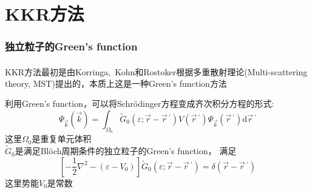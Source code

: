 \documentclass[cjk,slidestop,compress,mathserif,blue]{beamer}
\newcommand{\upcite}[1]{\hspace{0ex}\textsuperscript{\cite{#1}}} %
\begin{document}
\section{KKR方法}
\frame
{
	\frametitle{独立粒子的\textrm{Green's function}}
\textrm{KKR}方法最初是由\textrm{Korringa}\upcite{PA13-392_1947},~\textrm{Kohn}和\textrm{Rostoker}\upcite{PR94-1111_1954}根据多重散射理论\textrm{(Multi-scattering theory, MST)}提出的，本质上这是一种\textrm{Green's function}方法

利用\textrm{Green's function}，可以将\textrm{Schr\"odinger}方程变成齐次积分方程的形式:
\begin{displaymath}
	\Psi_{\vec k}(\vec k)=\int_{\Omega_0}\tilde G_0(\varepsilon;\vec r-\vec r\,^{\prime})V(\vec r\,^{\prime})\Psi_{\vec k}(\vec r\,^{\prime})\mathrm{d}\vec r\,^{\prime}
\end{displaymath}
这里$\Omega_0$是重复单元体积\\$\tilde G_0$是满足\textrm{Bl\"och}周期条件的独立粒子的\textrm{Green's function}，%
满足%
\begin{displaymath}
	\left[-\dfrac12\nabla^2-(\varepsilon-V_0)\right]\tilde G_0(\varepsilon;\vec r-\vec r\,^{\prime})=\delta(\vec r-\vec r\,^{\prime})
\end{displaymath}
这里势能$V_0$是常数
}
\end{document}
